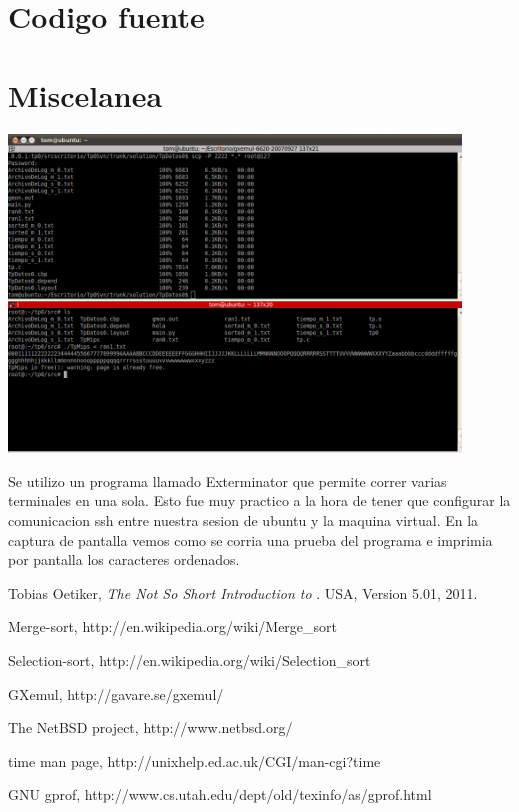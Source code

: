 \section{Codigo fuente}


\section{Miscelanea}
\includegraphics[width=12cm]{Imagenes/gxemul.PNG}

Se utilizo un programa llamado Exterminator que permite correr varias terminales en una sola.
Esto fue muy practico a la hora de tener que configurar la comunicacion ssh entre nuestra sesion de ubuntu y la maquina virtual.
En la captura de pantalla vemos como se corria una prueba del programa e imprimia por pantalla los caracteres ordenados.

\begin{thebibliography}{9}

      Tobias Oetiker,
      \emph{The Not So Short Introduction to \LaTeXe}.
      USA,
      Version 5.01,
      2011.

      Merge-sort, \textrm{http://en.wikipedia.org/wiki/Merge\_sort}

      Selection-sort, \textrm{http://en.wikipedia.org/wiki/Selection\_sort}

      GXemul, \textrm{http://gavare.se/gxemul/}

      The NetBSD project, \textup{http://www.netbsd.org/}

      time man page, \textrm{http://unixhelp.ed.ac.uk/CGI/man-cgi?time}

      GNU gprof, \textrm{http://www.cs.utah.edu/dept/old/texinfo/as/gprof.html} 


\end{thebibliography}

          
